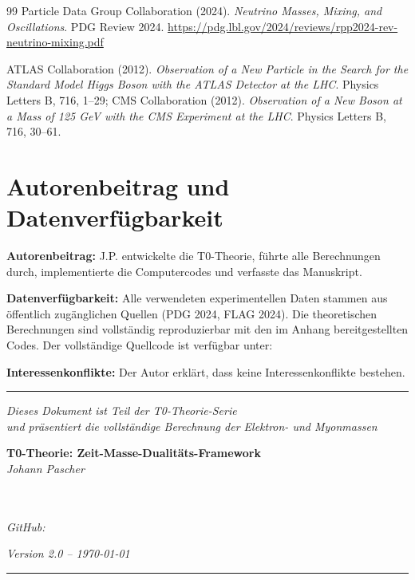 \begin{thebibliography}{99}
		Particle Data Group Collaboration (2024). 
		\textit{Neutrino Masses, Mixing, and Oscillations}. 
		PDG Review 2024.
		\url{https://pdg.lbl.gov/2024/reviews/rpp2024-rev-neutrino-mixing.pdf}
		
		ATLAS Collaboration (2012). 
		\textit{Observation of a New Particle in the Search for the Standard Model Higgs Boson with the ATLAS Detector at the LHC}. 
		Physics Letters B, 716, 1--29; 
		CMS Collaboration (2012). 
		\textit{Observation of a New Boson at a Mass of 125 GeV with the CMS Experiment at the LHC}. 
		Physics Letters B, 716, 30--61.
		
	\end{thebibliography}
	
	\section*{Autorenbeitrag und Datenverfügbarkeit}
	
	\textbf{Autorenbeitrag:} J.P. entwickelte die T0-Theorie, führte alle Berechnungen durch, implementierte die Computercodes und verfasste das Manuskript.
	
	\textbf{Datenverfügbarkeit:} Alle verwendeten experimentellen Daten stammen aus öffentlich zugänglichen Quellen (PDG 2024, FLAG 2024). Die theoretischen Berechnungen sind vollständig reproduzierbar mit den im Anhang bereitgestellten Codes. Der vollständige Quellcode ist verfügbar unter: 
	
	\textbf{Interessenkonflikte:} Der Autor erklärt, dass keine Interessenkonflikte bestehen.
	
	\vspace{1cm}
	
	\begin{center}
		\rule{0.8\textwidth}{0.4pt}
		\vspace{0.5cm}
		
		\textit{Dieses Dokument ist Teil der T0-Theorie-Serie}\\
		\textit{und präsentiert die vollständige Berechnung der Elektron- und Myonmassen}\\
		\vspace{0.3cm}
		
		\textbf{T0-Theorie: Zeit-Masse-Dualitäts-Framework}\\
		\textit{Johann Pascher}\\
		\textit{}\\
		\vspace{0.3cm}
		
		\textit{}\\
		\textit{GitHub: }\\
		\vspace{0.3cm}
		
		\textit{Version 2.0 -- \today}\\
		\vspace{0.2cm}
		
		\rule{0.8\textwidth}{0.4pt}
	\end{center}
	
